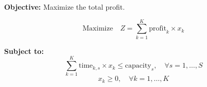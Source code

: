 \documentclass{article}
\begin{document}
\textbf{Objective:} Maximize the total profit.

\[
\text{Maximize} \quad Z = \sum_{k=1}^{K} \text{profit}_k \times x_k
\]

\textbf{Subject to:}
\[
\sum_{k=1}^{K} \text{time}_{k, s} \times x_k \leq \text{capacity}_s, \quad \forall s = 1, \ldots, S
\]
\[
x_k \geq 0, \quad \forall k = 1, \ldots, K
\]
\end{document}
